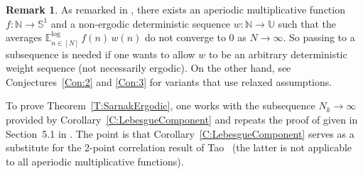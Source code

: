 \documentclass[11pt]{amsart}
\theoremstyle{definition}
\newtheorem*{remark}{Remark}
\newcommand{\lE}{\mathbb{E}^{\log}}
\newcommand{\N}{{\mathbb N}}
\renewcommand{\S}{\mathbb{S}}
\newcommand{\U}{{\mathbb U}}
\begin{document}
\begin{remark}
	As remarked in \cite[Section~5.2]{GLR21},
	there exists an aperiodic multiplicative function $f\colon \N\to \S^1$ and a non-ergodic deterministic sequence $w\colon \N\to \U$ such that  the averages
	$ \lE_{n\in [N]} \, f(n)\, w(n)$ do not converge to $0$ as $N\to\infty$.
	So passing to a subsequence is needed if one wants to allow $w$ to be  an arbitrary deterministic weight sequence (not necessarily ergodic). On the other hand, see Conjectures~\ref{Con:2} and \ref{Con:3} for variants that use relaxed assumptions.
\end{remark}
To prove Theorem~\ref{T:SarnakErgodic}, one works with the subsequence $N_k\to\infty$ provided by Corollary~\ref{C:LebesgueComponent}  and repeats the proof of \cite[Theorem~1.1]{FH21} given in Section~5.1 in \cite{FH21}.  The point is that
Corollary~\ref{C:LebesgueComponent} serves as a substitute for the 2-point correlation result of Tao~\cite{Tao15} (the latter is not applicable to all  aperiodic
multiplicative functions).
\end{document}
